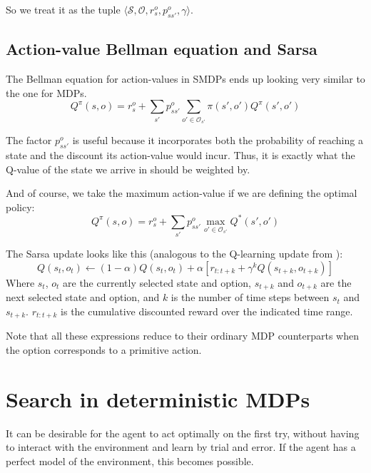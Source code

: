 So we treat it as the tuple $\langle \mathcal{S}, \mathcal{O}, r^o_s, p^o_{ss'},
\gamma\rangle$.

\subsection{Action-value Bellman equation and Sarsa}
The Bellman equation for action-values in \acp{SMDP} ends up looking very
similar to the one for \acp{MDP}.
\begin{equation}
  Q^\pi(s, o) = r^o_s + \sum_{s'}p^o_{ss'} \sum_{o' \in \mathcal{O}_{s'}} \pi(s', o')Q^\pi(s', o')
  \label{eq:smdp-bellman-q}
\end{equation}

The factor $p^o_{ss'}$ is useful because it incorporates both the probability of
reaching a state and the discount its action-value would incur. Thus, it is
exactly what the Q-value of the state we arrive in should be weighted by.

And of course, we take the maximum action-value if we are defining the optimal policy:
\begin{equation}
  Q^\pi(s, o) = r^o_s + \sum_{s'}p^o_{ss'} \max_{o' \in \mathcal{O}_{s'}} Q^*(s', o')
\end{equation}

The Sarsa update looks like this (analogous to the Q-learning update from
\citet[Section~3.2]{sutton1999between}):
\begin{equation}
  Q(s_t, o_t) \gets (1-\alpha)Q(s_t, o_t) + \alpha \left[r_{t:t+k} + \gamma^k Q(s_{t+k}, o_{t+k}) \right]
\end{equation}
Where $s_t$, $o_t$ are the currently selected state and option, $s_{t+k}$ and
$o_{t+k}$ are the next selected state and option, and $k$ is the number of time
steps between $s_t$ and $s_{t+k}$. $r_{t:t+k}$ is the cumulative discounted
reward over the indicated time range.

Note that all these expressions reduce to their ordinary \ac{MDP} counterparts
when the option corresponds to a primitive action.

\section{Search in deterministic \acp{MDP}\label{sec:search}}

It can be desirable for the agent to act optimally on the first try, without
having to interact with the environment and learn by trial and error. If the
agent has a perfect model of the environment, this becomes possible.

